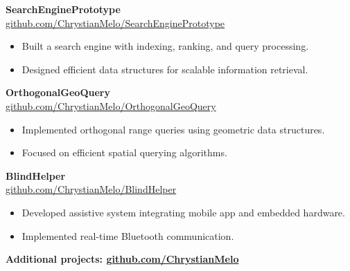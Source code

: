 \documentclass[10pt]{article}
\begin{document}
\noindent\textbf{SearchEnginePrototype} \\
\href{https://github.com/ChrystianMelo/SearchEnginePrototype}{github.com/ChrystianMelo/SearchEnginePrototype}
\begin{itemize}
    \item Built a search engine with indexing, ranking, and query processing.
    \item Designed efficient data structures for scalable information retrieval.
\end{itemize}

\noindent\textbf{OrthogonalGeoQuery} \\
\href{https://github.com/ChrystianMelo/OrthogonalGeoQuery}{github.com/ChrystianMelo/OrthogonalGeoQuery}
\begin{itemize}
    \item Implemented orthogonal range queries using geometric data structures.
    \item Focused on efficient spatial querying algorithms.
\end{itemize}

\noindent\textbf{BlindHelper} \\
\href{https://github.com/ChrystianMelo/BlindHelper}{github.com/ChrystianMelo/BlindHelper}
\begin{itemize}
    \item Developed assistive system integrating mobile app and embedded hardware.
    \item Implemented real-time Bluetooth communication.
\end{itemize}

\vspace{0.2em}
\noindent\textbf{Additional projects: \href{https://github.com/ChrystianMelo?tab=repositories}{github.com/ChrystianMelo}}
\end{document}
